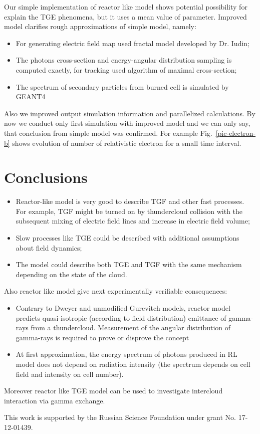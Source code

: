 \documentclass[%
 aip,
cp,  %
 amsmath,amssymb,%
 reprint,%
]{revtex4-2}
\begin{document}
Our simple implementation of reactor like model shows potential possibility for explain the TGE phenomena, but it uses a mean value of parameter. 
Improved model clarifies rough approximations of simple model, namely:
\begin{itemize}
	\item For generating electric field map used fractal model developed by Dr. Iudin; ~\cite{Iudin:2018}
	\item The photons cross-section and energy-angular distribution sampling  is computed exactly, for tracking used algorithm of maximal cross-section;
	\item The spectrum of secondary particles from burned cell is simulated by GEANT4~\cite{ALLISON2016186}
\end{itemize}

Also we improved output simulation information and parallelized calculations. By now we conduct only first simulation with improved model and we can only say, that conclusion from simple model  was confirmed. For example Fig.~\ref{pic-electron-b} shows evolution of number of relativistic electron for a small time interval.
\section{Conclusions}
\begin{itemize}
   	\item Reactor-like model is very good to describe TGF and other fast processes. For example, TGF might be turned on by thundercloud collision with the subsequent mixing of electric field lines and increase in electric field volume;
   	\item Slow processes like TGE could be described with additional assumptions about field dynamics;
   	\item The model could describe both TGE and TGF with the same mechanism depending on the state of the cloud.
\end{itemize}

Also reactor like model give next experimentally verifiable consequences:
\begin{itemize}
   	\item Contrary to Dweyer and unmodified Gurevitch models, reactor model predicts quasi-isotropic (according to field distribution) emittance of gamma-rays from a thundercloud. 	Measurement of the angular distribution of gamma-rays is required to prove or disprove the concept
   	\item At first approximation, the energy spectrum of photons produced in RL model does not depend on radiation intensity (the spectrum depends on cell field and intensity on cell number).
\end{itemize}
Moreover reactor like TGE model can be used to investigate intercloud interaction via gamma exchange.
\begin{acknowledgments}
This work is supported by the Russian Science Foundation under grant No. 17-12-01439.
\end{acknowledgments}
\nocite{*}
\end{document}
